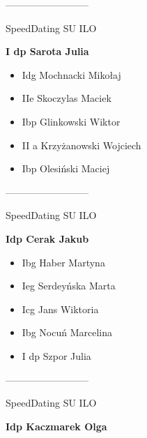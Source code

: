 \documentclass[a4paper,10pt]{article}
\begin{document}
\begin{multicols}{3}
\begin{minipage}[l]{\textwidth}
\begin{itemize}
    \end{itemize}



\end{minipage}



\begin{minipage}[l]{\textwidth}
--------------------------

  \footnotesize{SpeedDating SU ILO}

  \bfseries{I dp Sarota Julia}

  \begin{itemize}
    \item Idg Mochnacki Mikołaj
    \item IIe Skoczylas Maciek
    \item Ibp Glinkowski Wiktor
    \item II a Krzyżanowski Wojciech
    \item Ibp Olesiński Maciej

    \end{itemize}



\end{minipage}



\begin{minipage}[l]{\textwidth}
--------------------------

  \footnotesize{SpeedDating SU ILO}

  \bfseries{Idp Cerak Jakub}

  \begin{itemize}
    \item Ibg Haber Martyna
    \item Ieg Serdeyńska Marta
    \item Icg Jans Wiktoria
    \item Ibg Nocuń Marcelina
    \item I dp Szpor Julia

    \end{itemize}



\end{minipage}



\begin{minipage}[l]{\textwidth}
--------------------------

  \footnotesize{SpeedDating SU ILO}

  \bfseries{Idp Kaczmarek Olga}


\end{minipage}
\end{multicols}
\end{document}

